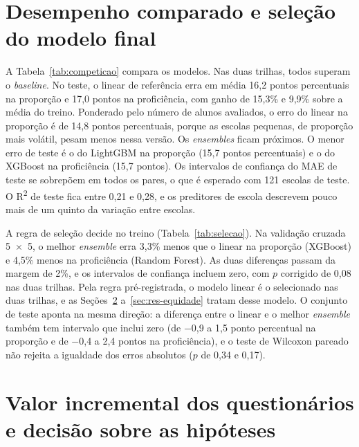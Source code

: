 \section{Desempenho comparado e seleção do modelo final}
\label{sec:res-modelos}

A Tabela~\ref{tab:competicao} compara os modelos. Nas duas trilhas, todos
superam o \textit{baseline}. No teste, o linear de referência erra em média
16,2 pontos percentuais na proporção e 17,0 pontos na proficiência, com
ganho de 15,3\% e 9,9\% sobre a média do treino. Ponderado pelo número
de alunos avaliados, o erro do linear na proporção é de 14,8 pontos
percentuais, porque as escolas pequenas, de proporção mais volátil, pesam
menos nessa versão. Os \textit{ensembles}
ficam próximos. O menor erro de teste é o do LightGBM na proporção
(15,7 pontos percentuais) e o do XGBoost na proficiência (15,7 pontos). Os
intervalos de confiança do MAE de teste se sobrepõem em todos os pares, o
que é esperado com 121 escolas de teste. O R\textsuperscript{2} de teste fica entre 0,21 e
0,28, e os preditores de escola descrevem pouco mais de um quinto da
variação entre escolas.



A regra de seleção decide no treino (Tabela~\ref{tab:selecao}). Na
validação cruzada 5~$\times$~5, o melhor \textit{ensemble} erra 3,3\% menos
que o linear na proporção (XGBoost) e 4,5\% menos na proficiência (Random
Forest). As duas diferenças passam da margem de 2\%, e os intervalos de
confiança incluem zero, com $p$ corrigido de 0,08 nas duas trilhas. Pela
regra pré-registrada, o modelo linear é o selecionado nas duas trilhas, e
as Seções~\ref{sec:res-hipoteses} a~\ref{sec:res-equidade} tratam desse
modelo. O conjunto de teste aponta na mesma direção: a diferença entre o
linear e o melhor \textit{ensemble} também tem intervalo que inclui zero
(de $-$0,9 a 1,5 ponto percentual na proporção e de $-$0,4 a 2,4 pontos
na proficiência), e o teste de Wilcoxon pareado não rejeita a igualdade
dos erros absolutos ($p$ de 0,34 e 0,17).



\section{Valor incremental dos questionários e decisão sobre as hipóteses}
\label{sec:res-hipoteses}

